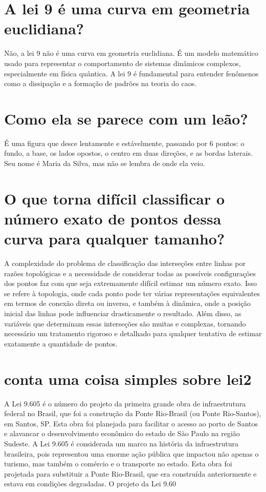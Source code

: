 \documentclass[11pt,a4paper]{article}
\begin{document}
\section{A lei 9 é uma curva em geometria euclidiana?}
Não, a lei 9 não é uma curva em geometria euclidiana. É um modelo matemático usado para representar o comportamento de sistemas dinâmicos complexos, especialmente em física quântica. A lei 9 é fundamental para entender fenômenos como a dissipação e a formação de padrões na teoria do caos.

\section{Como ela se parece com um leão?}
É uma figura que desce lentamente e estávelmente, passando por 6 pontos: o fundo, a base, os lados opostos, o centro em duas direções, e as bordas laterais. Seu nome é Maria da Silva, mas não se lembra de onde ela veio.

\section{O que torna difícil classificar o número exato de pontos dessa curva para qualquer tamanho?}
A complexidade do problema de classificação das interseções entre linhas por razões topológicas e a necessidade de considerar todas as possíveis configurações dos pontos faz com que seja extremamente difícil estimar um número exato. Isso se refere à topologia, onde cada ponto pode ter várias representações equivalentes em termos de conexão direta ou inversa, e também à dinâmica, onde a posição inicial das linhas pode influenciar drasticamente o resultado. Além disso, as variáveis que determinam essas interseções são muitas e complexas, tornando necessário um tratamento rigoroso e detalhado para qualquer tentativa de estimar exatamente a quantidade de pontos.

\section{conta uma coisa simples sobre lei2}
A Lei 9.605 é o número do projeto da primeira grande obra de infraestrutura federal no Brasil, que foi a construção da Ponte Rio-Brasil (ou Ponte Rio-Santos), em Santos, SP. Esta obra foi planejada para facilitar o acesso ao porto de Santos e alavancar o desenvolvimento econômico do estado de São Paulo na região Sudeste. A Lei 9.605 é considerada um marco na história da infraestrutura brasileira, pois representou uma enorme ação pública que impactou não apenas o turismo, mas também o comércio e o transporte no estado. Esta obra foi projetada para substituir a Ponte Rio-Brasil, que era construída anteriormente e estava em condições degradadas. O projeto da Lei 9.60
\end{document}
